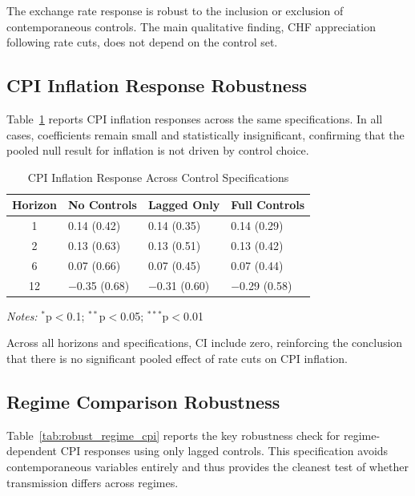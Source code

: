 \documentclass[12pt,a4paper]{article}
\begin{document}
\begin{appendices}
The exchange rate response is robust to the inclusion or exclusion of contemporaneous controls. The main qualitative finding, CHF appreciation following rate cuts, does not depend on the control set.

\subsection{CPI Inflation Response Robustness}

Table~\ref{tab:robust_controls_cpi} reports CPI inflation responses across the same specifications. In all cases, coefficients remain small and statistically insignificant, confirming that the pooled null result for inflation is not driven by control choice.

\begin{table}[H]
	\centering
	\caption{CPI Inflation Response Across Control Specifications} 
	\label{tab:robust_controls_cpi}
	\begin{tabular}{clll}
		\toprule
		Horizon & No Controls & Lagged Only & Full Controls \\ 
		\midrule
		1  & 0.14 (0.42)   & 0.14 (0.35)   & 0.14 (0.29)   \\ 
		2  & 0.13 (0.63)   & 0.13 (0.51)   & 0.13 (0.42)   \\ 
		6  & 0.07 (0.66)   & 0.07 (0.45)   & 0.07 (0.44)   \\ 
		12 & $-$0.35 (0.68) & $-$0.31 (0.60) & $-$0.29 (0.58) \\ 
		\bottomrule
	\end{tabular}
	\vspace{0.2cm}
	
	{\footnotesize
		\textit{Notes:} $^{*}$p$<$0.1; $^{**}$p$<$0.05; $^{***}$p$<$0.01}
\end{table}

Across all horizons and specifications, CI include zero, reinforcing the conclusion that there is no significant pooled effect of rate cuts on CPI inflation.

\subsection{Regime Comparison Robustness}

Table~\ref{tab:robust_regime_cpi} reports the key robustness check for regime-dependent CPI responses using only lagged controls. This specification avoids contemporaneous variables entirely and thus provides the cleanest test of whether transmission differs across regimes.


\end{appendices}
\end{document}
